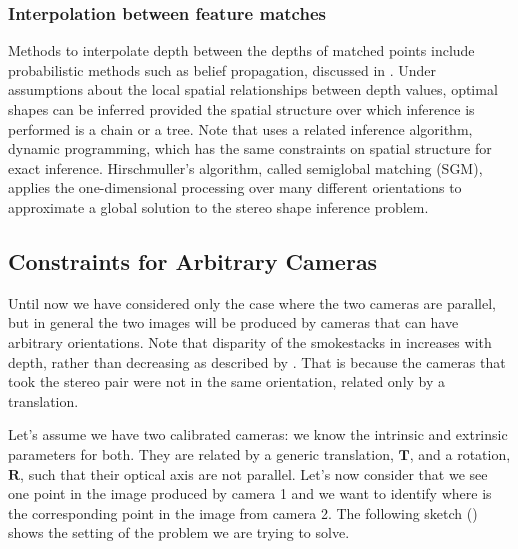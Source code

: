 \subsubsection{Interpolation between feature matches}
Methods to interpolate depth between the depths of matched points include probabilistic methods such as belief propagation, discussed in 
\chap{\ref{chapter:probabilistic_graphical_models}}.
Under assumptions about the local spatial relationships between depth values, optimal shapes can be inferred provided the spatial structure over which inference is performed is a chain or a tree.  Note that \cite{Hirschmuller2007} uses a related inference algorithm, dynamic programming, which has the same constraints on spatial structure for exact inference.  Hirschmuller's algorithm, called semiglobal matching (SGM), applies the one-dimensional processing over many different orientations to approximate a global solution to the stereo shape inference problem.


\subsection{Constraints for Arbitrary Cameras}

Until now we have considered only the case where the two cameras are parallel, but in general the two images will be produced by cameras that can have arbitrary orientations. Note that disparity of the smokestacks in  increases with depth, rather than decreasing as described by \eqn{\ref{eq:depthFromDisparity}}.  That is because the cameras that took the stereo pair were not in the same orientation, related only by a translation.






Let's assume we have two calibrated cameras: we know the intrinsic and extrinsic parameters for both. They are related by a generic translation, $\mathbf{T}$, and a rotation, $\mathbf{R}$, such that their optical axis are not parallel. Let's now consider that we see one point in the image produced by camera 1 and we want to identify where is the corresponding point in the image from camera 2. The following sketch (\fig{\ref{fig:epipolar_1}}) shows the setting of the problem we are trying to solve.

